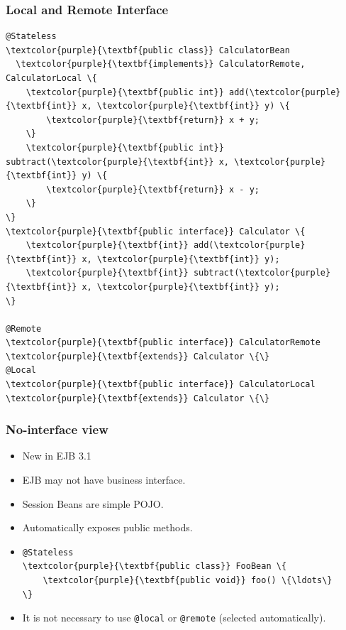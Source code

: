 \documentclass[10pt,xcolor=pdflatex]{beamer}
\begin{document}
\begin{frame}[fragile]\frametitle{Local and Remote Interface}
\begin{Verbatim}[fontsize=\footnotesize, commandchars=\\\{\}]
@Stateless
\textcolor{purple}{\textbf{public class}} CalculatorBean 
  \textcolor{purple}{\textbf{implements}} CalculatorRemote, CalculatorLocal \{
    \textcolor{purple}{\textbf{public int}} add(\textcolor{purple}{\textbf{int}} x, \textcolor{purple}{\textbf{int}} y) \{
        \textcolor{purple}{\textbf{return}} x + y;
    \}
    \textcolor{purple}{\textbf{public int}} subtract(\textcolor{purple}{\textbf{int}} x, \textcolor{purple}{\textbf{int}} y) \{
        \textcolor{purple}{\textbf{return}} x - y;
    \}
\}
\textcolor{purple}{\textbf{public interface}} Calculator \{
    \textcolor{purple}{\textbf{int}} add(\textcolor{purple}{\textbf{int}} x, \textcolor{purple}{\textbf{int}} y);
    \textcolor{purple}{\textbf{int}} subtract(\textcolor{purple}{\textbf{int}} x, \textcolor{purple}{\textbf{int}} y);
\}

@Remote
\textcolor{purple}{\textbf{public interface}} CalculatorRemote \textcolor{purple}{\textbf{extends}} Calculator \{\}
@Local
\textcolor{purple}{\textbf{public interface}} CalculatorLocal \textcolor{purple}{\textbf{extends}} Calculator \{\}
\end{Verbatim}
\end{frame}


\begin{frame}[fragile]\frametitle{No-interface view}
	\begin{itemize}
		\item New in EJB 3.1
		\item EJB may not have business interface.
		\item Session Beans are simple POJO.
		\item Automatically exposes public methods.
        \item[] \begin{Verbatim}[fontsize=\footnotesize, commandchars=\\\{\}]
@Stateless
\textcolor{purple}{\textbf{public class}} FooBean \{ 
    \textcolor{purple}{\textbf{public void}} foo() \{\ldots\}
\}
				\end{Verbatim}
        \item It is not necessary to use \texttt{@local} or \texttt{@remote} (selected automatically).
	\end{itemize}
\end{frame}
\end{document}

